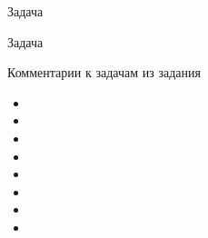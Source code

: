 \documentclass[12]{beamer}
\begin{document}
\begin{frame}{Задача }\scriptsize
{}
\end{frame}

\begin{frame}{Задача }\scriptsize
{}
\end{frame}



\begin{frame}[t]{Комментарии к задачам из задания}\scriptsize
\begin{itemize}
\item 
\item 
\item 
\item
\item
\item
\item
\item
\end{itemize}
\end{frame}
\end{document}
